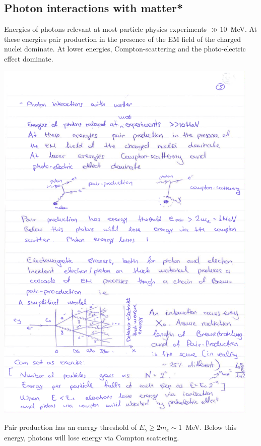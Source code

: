 \subsection{Photon interactions with matter*}
Energies of photons relevant at most particle physics experiments $\gg10$~MeV.
At these energies pair production in the presence of the EM field of the charged nuclei dominate. At lower energies, Compton-scattering and the photo-electric effect dominate.
\begin{center}
\includegraphics[width=0.95\textwidth]{fig/detector/photon_interactions.pdf}
\end{center}
Pair production has an energy threshold of $E_{\gamma}\geq 2m_{e}\sim1$~MeV. Below this energy, photons will lose energy via Compton scattering.
